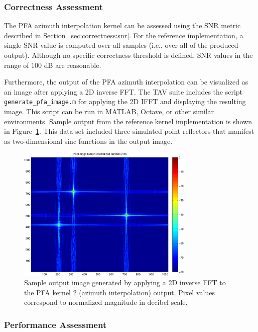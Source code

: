 \documentclass{report}
\begin{document}
\subsubsection{Correctness Assessment}

The PFA azimuth interpolation kernel can be assessed using the SNR metric described
in Section~\ref{sec:correctness:snr}.
For the reference implementation, a single SNR value is computed over all
samples (i.e., over all of the produced output).
Although no specific correctness threshold is defined, SNR values in the
range of $100$ dB are reasonable.

Furthermore, the output of the PFA azimuth interpolation can be visualized
as an image after applying a {2D} inverse FFT.
The TAV suite includes the script \texttt{generate\_pfa\_image.m} for
applying the 2D IFFT and displaying the resulting image.
This script can be run in MATLAB, Octave, or other similar environments.
Sample output from the reference kernel implementation is shown in
Figure~\ref{fig:pfa_output}.
This data set included three simulated point reflectors that manifest
as two-dimensional sinc functions in the output image.

\begin{figure}
    \centering
    \includegraphics[width=0.75\textwidth]{figs/sample_pfa_output}
    \caption{Sample output image generated by applying a 2D inverse FFT to
the PFA kernel 2 (azimuth interpolation) output.  %
Pixel values correspond to normalized magnitude in decibel scale.}
    \label{fig:pfa_output}
\end{figure}

\subsubsection{Performance Assessment}
\end{document}
